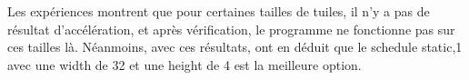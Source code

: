 \documentclass[10pt, a4paper]{article}
\begin{document}
Les expériences montrent que pour certaines tailles de tuiles, il n'y a pas de résultat d'accélération, et après vérification, le programme ne fonctionne pas sur ces tailles là.
Néanmoins, avec ces résultats, ont en déduit que le schedule static,1 avec une width de 32 et une height de 4 est la meilleure option.


\end{document}
